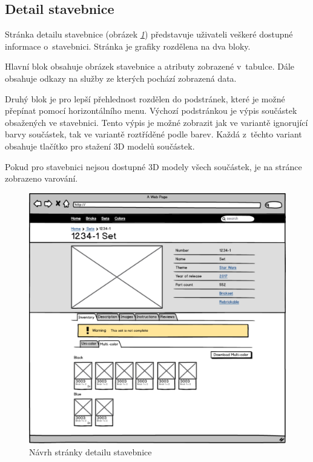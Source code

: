 \subsection{Detail stavebnice}
Stránka detailu stavebnice (obrázek \emph{\ref{wireframe-stavebnice-detail}}) představuje uživateli veškeré dostupné informace o~stavebnici. Stránka je grafiky rozdělena na dva bloky. 

Hlavní blok obsahuje obrázek stavebnice a atributy zobrazené v~tabulce. Dále obsahuje odkazy na služby ze kterých pochází zobrazená data.

Druhý blok je pro lepší přehlednost rozdělen do podstránek, které je možné přepínat pomocí horizontálního menu. Výchozí podstránkou je výpis součástek obsažených ve stavebnici. Tento výpis je možné zobrazit jak ve variantě ignorující barvy součástek, tak ve variantě roztříděné podle barev. Každá z~těchto variant obsahuje tlačítko pro stažení 3D modelů součástek.

Pokud pro stavebnici nejsou dostupné 3D modely všech součástek, je na stránce zobrazeno varování. 

\begin{figure}[htbp]
    \centering
    \includegraphics[width=\textwidth,height=\textheight,keepaspectratio]{pdfs/wireframe_set.pdf}
    \caption{Návrh stránky detailu stavebnice}\label{wireframe-stavebnice-detail}
\end{figure}

